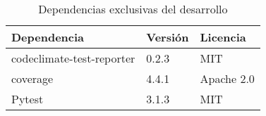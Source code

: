 \begin{table}[]
\centering
\begin{tabular}{lll}
\hline
Dependencia & Versión & Licencia \\ \hline
codeclimate-test-reporter & 0.2.3 & MIT \\
coverage & 4.4.1 & Apache 2.0 \\ 
Pytest & 3.1.3 & MIT \\ \hline
\end{tabular}
\caption{Dependencias exclusivas del desarrollo}
\label{Dependencias exclusivas en desarrollo}
\end{table}


